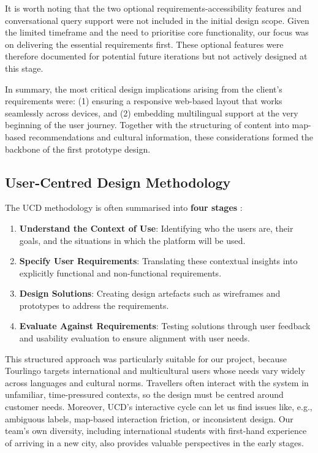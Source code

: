 It is worth noting that the two optional requirements-accessibility features and conversational query support were not included in the initial design scope. Given the limited timeframe and the need to prioritise core functionality, our focus was on delivering the essential requirements first. These optional features were therefore documented for potential future iterations but not actively designed at this stage. 

In summary, the most critical design implications arising from the client’s requirements were: (1) ensuring a responsive web-based layout that works seamlessly across devices, and (2) embedding multilingual support at the very beginning of the user journey. Together with the structuring of content into map-based recommendations and cultural information, these considerations formed the backbone of the first prototype design.

\subsection{User-Centred Design Methodology}
The UCD methodology is often summarised into \textbf{four stages} \cite{ux_ucd_interaction}:

\begin{enumerate}
    \item \textbf{Understand the Context of Use}: Identifying who the users are, their goals, and the situations in which the platform will be used.
    \item \textbf{Specify User Requirements}: Translating these contextual insights into explicitly functional and non-functional requirements.
    \item \textbf{Design Solutions}: Creating design artefacts such as wireframes and prototypes to address the requirements.
    \item \textbf{Evaluate Against Requirements}: Testing solutions through user feedback and usability evaluation to ensure alignment with user needs.
\end{enumerate}

This structured approach was particularly suitable for our project, because Tourlingo targets international and multicultural users whose needs vary widely across languages and cultural norms. Travellers often interact with the system in unfamiliar, time-pressured contexts, so the design must be centred around customer needs. Moreover, UCD's interactive cycle can let us find issues like, e.g., ambiguous labels, map-based interaction friction, or inconsistent design. Our team's own diversity, including international students with first-hand experience of arriving in a new city, also provides valuable perspectives in the early stages.


